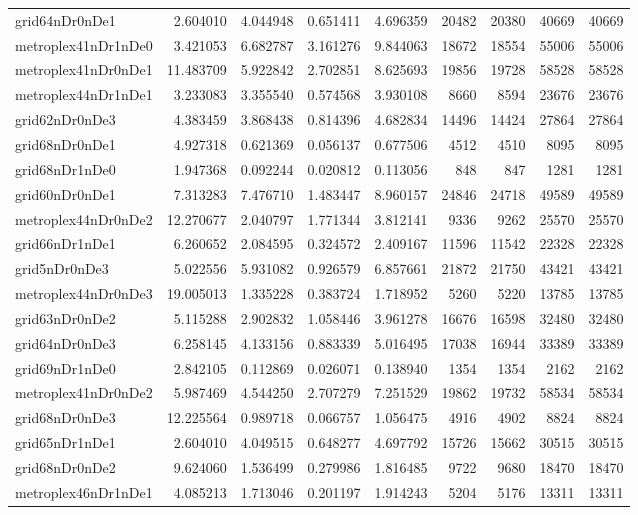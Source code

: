 \begin{longtable}{|l|r|r|r|r|r|r|r|r|}
grid64nDr0nDe1 & 2.604010 & 4.044948 & 0.651411 & 4.696359 & 20482 & 20380 & 40669 & 40669 \\
metroplex41nDr1nDe0 & 3.421053 & 6.682787 & 3.161276 & 9.844063 & 18672 & 18554 & 55006 & 55006 \\
metroplex41nDr0nDe1 & 11.483709 & 5.922842 & 2.702851 & 8.625693 & 19856 & 19728 & 58528 & 58528 \\
metroplex44nDr1nDe1 & 3.233083 & 3.355540 & 0.574568 & 3.930108 & 8660 & 8594 & 23676 & 23676 \\
grid62nDr0nDe3 & 4.383459 & 3.868438 & 0.814396 & 4.682834 & 14496 & 14424 & 27864 & 27864 \\
grid68nDr0nDe1 & 4.927318 & 0.621369 & 0.056137 & 0.677506 & 4512 & 4510 & 8095 & 8095 \\
grid68nDr1nDe0 & 1.947368 & 0.092244 & 0.020812 & 0.113056 & 848 & 847 & 1281 & 1281 \\
grid60nDr0nDe1 & 7.313283 & 7.476710 & 1.483447 & 8.960157 & 24846 & 24718 & 49589 & 49589 \\
metroplex44nDr0nDe2 & 12.270677 & 2.040797 & 1.771344 & 3.812141 & 9336 & 9262 & 25570 & 25570 \\
grid66nDr1nDe1 & 6.260652 & 2.084595 & 0.324572 & 2.409167 & 11596 & 11542 & 22328 & 22328 \\
grid5nDr0nDe3 & 5.022556 & 5.931082 & 0.926579 & 6.857661 & 21872 & 21750 & 43421 & 43421 \\
metroplex44nDr0nDe3 & 19.005013 & 1.335228 & 0.383724 & 1.718952 & 5260 & 5220 & 13785 & 13785 \\
grid63nDr0nDe2 & 5.115288 & 2.902832 & 1.058446 & 3.961278 & 16676 & 16598 & 32480 & 32480 \\
grid64nDr0nDe3 & 6.258145 & 4.133156 & 0.883339 & 5.016495 & 17038 & 16944 & 33389 & 33389 \\
grid69nDr1nDe0 & 2.842105 & 0.112869 & 0.026071 & 0.138940 & 1354 & 1354 & 2162 & 2162 \\
metroplex41nDr0nDe2 & 5.987469 & 4.544250 & 2.707279 & 7.251529 & 19862 & 19732 & 58534 & 58534 \\
grid68nDr0nDe3 & 12.225564 & 0.989718 & 0.066757 & 1.056475 & 4916 & 4902 & 8824 & 8824 \\
grid65nDr1nDe1 & 2.604010 & 4.049515 & 0.648277 & 4.697792 & 15726 & 15662 & 30515 & 30515 \\
grid68nDr0nDe2 & 9.624060 & 1.536499 & 0.279986 & 1.816485 & 9722 & 9680 & 18470 & 18470 \\
metroplex46nDr1nDe1 & 4.085213 & 1.713046 & 0.201197 & 1.914243 & 5204 & 5176 & 13311 & 13311 \\

\end{longtable}
